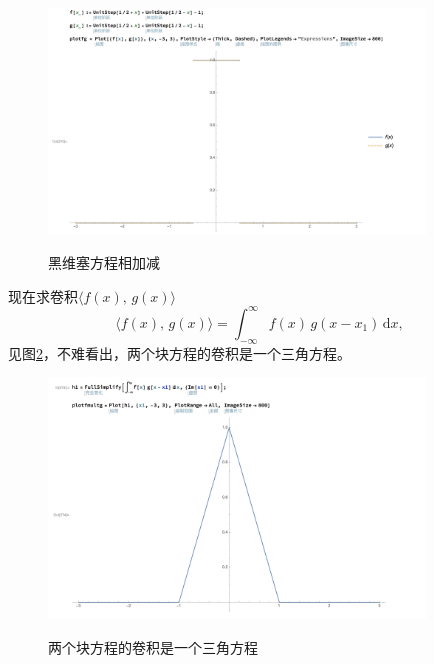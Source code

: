 \begin{subappendices}
\begin{figure}[htbp]
  \caption{黑维塞方程相加减}
  \centering
  \includegraphics[width=10cm]{./Figures/20180405-convolution-fg}
  \label{fig:convolution-fg}
%
\end{figure}

现在求卷积$\langle f(x), \, g (x) \rangle$
\begin{equation*}
  \langle f(x), \, g (x) \rangle =
  \int_{-\infty}^{\infty} f \left( x \right) \, g \left( x - x_{1} \right) \, \mathrm{d} x,
\end{equation*}
见图\ref{fig:convolution-fg-1}，不难看出，两个块方程的卷积是一个三角方程。
\begin{figure}[htbp]
  \caption{两个块方程的卷积是一个三角方程}
  \centering
  \includegraphics[width=10cm]{./Figures/20180405-convolution-fg-1}
  \label{fig:convolution-fg-1}
%
\end{figure}


\end{subappendices}
